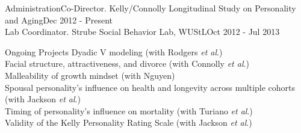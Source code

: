 \documentclass {resume}
\newcommand{\et}{\textit{et al}.\xspace}
\begin{document}
\begin{samepage}\begin{rSection}{\textrm{Administration}}Co-Director. Kelly/Connolly Longitudinal Study on Personality and Aging\hfill Dec 2012 - Present\smallskip\\
Lab Coordinator. Strube Social Behavior Lab,  WUStL\hfill Oct 2012 - Jul 2013
\end{rSection}\end{samepage}


\begin{rSection}{\textrm{Ongoing Projects}}
Dyadic \textrm{V} modeling (with Rodgers \et)\smallskip\\
Facial structure, attractiveness, and divorce (with Connolly \et)\smallskip\\
Malleability of growth mindset (with Nguyen)\smallskip\\
Spousal personality's influence on health and longevity across multiple cohorts (with Jackson \et)\smallskip\\
Timing of personality's influence on mortality (with Turiano \et)\smallskip\\
Validity of the Kelly Personality Rating Scale (with Jackson \et)
\end{rSection}
\end{document}
